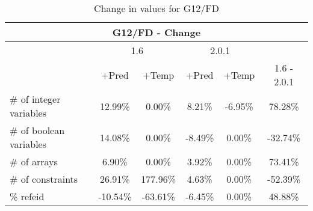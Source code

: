 \documentclass{standalone}
\begin{document}
\begin{table}[H]
\footnotesize
\centering
\begin{tabular}{lc|c|c|c|c}
\multicolumn{6}{c}{G12/FD - Change} \\ 
\hline\hline  & \multicolumn{2}{c|}{1.6} &\multicolumn{2}{c|}{2.0.1} &\\ 
\hline  & +Pred & +Temp & +Pred & +Temp & 1.6 - 2.0.1\\
\# of integer variables & 12.99\% & 0.00\% & 8.21\% & -6.95\% & 78.28\% \\ 
\# of boolean variables & 14.08\% & 0.00\% & -8.49\% & 0.00\% & -32.74\% \\
\# of arrays            & 6.90\% & 0.00\% & 3.92\% & 0.00\% & 73.41\% \\
\# of constraints       & 26.91\% & 177.96\% & 4.63\% & 0.00\% & -52.39\% \\ 
\% refeid               & -10.54\% & -63.61\% & -6.45\% & 0.00\% & 48.88\%\\ 
\end{tabular}\caption{Change in values for G12/FD}
\end{table}
\end{document}
